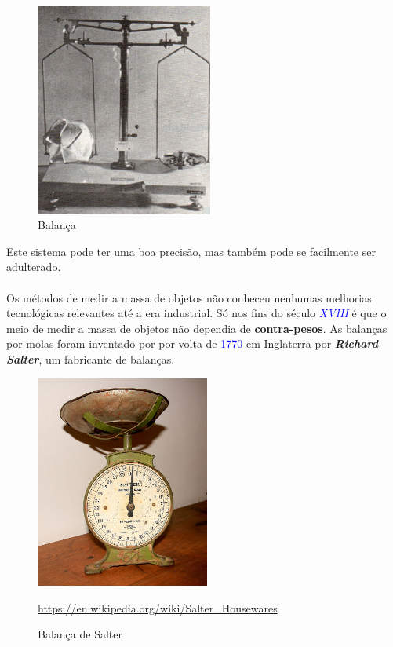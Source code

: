 \hspace{2.2cm}
\begin{minipage}[!b]{0.45\linewidth}
	\begin{figure}[H]
		\centering
		\includegraphics[height=7cm]{./image/PESTA/general/balanca_4.jpg}
		\caption{Balança}
		\label{balanca_4}
	\end{figure}
\end{minipage}
\newline
\newline
\newline
Este sistema pode ter uma boa precisão, mas também pode se facilmente ser adulterado.
\\
\\
Os métodos de medir a massa de objetos não conheceu nenhumas melhorias tecnológicas relevantes até a era industrial. Só nos fins do século \textcolor{blue}{\textit{XVIII}} é que o meio de medir a massa de objetos não dependia de \textbf{contra-pesos}. As balanças por molas foram inventado por  por volta de \textcolor{blue}{1770} em Inglaterra por \textbf{\textit{Richard Salter}}, um fabricante de balanças.
\\
\begin{figure}[H]
	\centering
	\includegraphics[height=7cm]{./image/PESTA/general/Weigh_Scale_Salter_1.jpg}
	\caption{Balança de Salter}
	\url{https://en.wikipedia.org/wiki/Salter_Housewares}
	\label{Weigh_Scale_Salter_1}
\end{figure}
